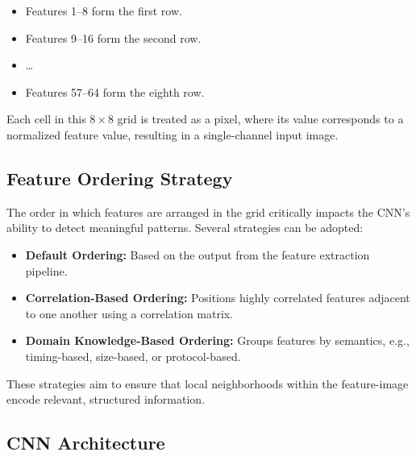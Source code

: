 \documentclass[12pt]{report}
\begin{document}
\begin{itemize}
    \item Features 1--8 form the first row.
    \item Features 9--16 form the second row.
    \item \dots
    \item Features 57--64 form the eighth row.
\end{itemize}

Each cell in this $8 \times 8$ grid is treated as a pixel, where its value corresponds to a normalized feature value, resulting in a single-channel input image.

\subsection{Feature Ordering Strategy}

The order in which features are arranged in the grid critically impacts the CNN’s ability to detect meaningful patterns. Several strategies can be adopted:

\begin{itemize}
    \item \textbf{Default Ordering:} Based on the output from the feature extraction pipeline.
    \item \textbf{Correlation-Based Ordering:} Positions highly correlated features adjacent to one another using a correlation matrix.
    \item \textbf{Domain Knowledge-Based Ordering:} Groups features by semantics, e.g., timing-based, size-based, or protocol-based.
\end{itemize}

These strategies aim to ensure that local neighborhoods within the feature-image encode relevant, structured information.

\subsection{CNN Architecture}
\end{document}
